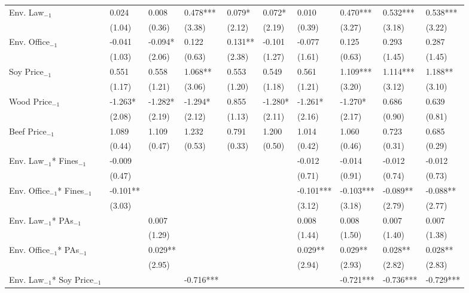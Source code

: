 \begin{landscape}
\begin{table}[htpb!]
\begin{tabularx}{0.82\linewidth}{l Z Z Z Z Z Z Z Z Z}
    Env. Law$_{-1}$ &	0.024	&	0.008	&	0.478***	&	0.079*	&	0.072*	&	0.010	&	0.470***	&	0.532***	&	0.538***	\\
                        & 	(1.04)	&	(0.36)	&	(3.38)	&	(2.12)	&	(2.19)	&	(0.39)	&	(3.27)	&	(3.18)	&	(3.22)	\\
    Env. Office$_{-1}$ & -0.041	&	-0.094*	&	0.122	&	0.131**	&	-0.101	&	-0.077	&	0.125	&	0.293	&	0.287	\\
                        & 	(1.03)	&	(2.06)	&	(0.63)	&	(2.38)	&	(1.27)	&	(1.61)	&	(0.63)	&	(1.45)	&	(1.45)	\\
    Soy Price$_{-1}$  & 0.551	&	0.558	&	1.068**	&	0.553	&	0.549	&	0.561	&	1.109***	&	1.114***	&	1.188**	\\
                        & 	(1.17)	&	(1.21)	&	(3.06)	&	(1.20)	&	(1.18)	&	(1.21)	&	(3.20)	&	(3.12)	&	(3.10)	\\
    Wood Price$_{-1}$  & -1.263*	&	-1.282*	&	-1.294*	&	0.855	&	-1.280*	&	-1.261*	&	-1.270*	&	0.686	&	0.639	\\
                        & 	(2.08)	&	(2.19)	&	(2.12)	&	(1.13)	&	(2.11)	&	(2.16)	&	(2.17)	&	(0.90)	&	(0.81)	\\
    Beef Price$_{-1}$  & 	1.089	&	1.109	&	1.232	&	0.791	&	1.200	&	1.014	&	1.060	&	0.723	&	0.685	\\
                        & 	(0.44)	&	(0.47)	&	(0.53)	&	(0.33)	&	(0.50)	&	(0.42)	&	(0.46)	&	(0.31)	&	(0.29)	\\
    Env. Law$_{-1}$* Fines$_{-1}$ & -0.009	&		&		&		&		&	-0.012	&	-0.014	&	-0.012	&	-0.012	\\
                        & 		(0.47)	&		&		&		&		&	(0.71)	&	(0.91)	&	(0.74)	&	(0.73)	\\
    Env. Office$_{-1}$* Fines$_{-1}$& -0.101**	&		&		&		&		&	-0.101***	&	-0.103***	&	-0.089**	&	-0.088**	\\
                        & (3.03)	&		&		&		&		&	(3.12)	&	(3.18)	&	(2.79)	&	(2.77)	\\
    Env. Law$_{-1}$* PAs$_{-1}$ &	&	0.007	&		&		&		&	0.008	&	0.008	&	0.007	&	0.007	\\
                        & 				&	(1.29)	&		&		&		&	(1.44)	&	(1.50)	&	(1.40)	&	(1.38)	\\
    Env. Office$_{-1}$* PAs$_{-1}$& 		&	0.029**	&		&		&		&	0.029**	&	0.029**	&	0.028**	&	0.028**	\\
                        & 		&	(2.95)	&		&		&		&	(2.94)	&	(2.93)	&	(2.82)	&	(2.83)	\\
    Env. Law$_{-1}$* Soy Price$_{-1}$  &  	&		&	-0.716***	&		&		&		&	-0.721***	&	-0.736***	&	-0.729***	\\

\end{tabularx}
\end{table}
\end{landscape}
